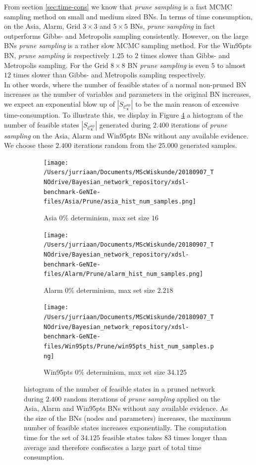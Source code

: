 \documentclass[a4paper, twoside, 11pt]{report}
\newcommand{\bfx}{{\mathbf{x}}}
\newcommand{\C}{{\mathcal C}}
\theoremstyle{plain}
\theoremstyle{definition}
\theoremstyle{remark}
\newcommand{\ps}{\textit{prune sampling }}
\begin{document}
From section \ref{sec:time-cons} we know that \ps is a fast MCMC sampling method on small and medium sized BNs. In terms of time consumption, on the Asia, Alarm, Grid $3 \times 3$ and $5 \times 5$ BNs, \ps in fact outperforms Gibbs- and Metropolis sampling consistently. However, on the large BNs \ps is a rather slow MCMC sampling method. For the Win95pts BN, \ps is respectively $1.25$ to $2$ times slower than Gibbs- and Metropolis sampling. For the Grid $8 \times 8$ BN \ps is even $5$ to almost $12$ times slower than Gibbs- and Metropolis sampling respectively. \\

In other words, where the number of feasible states of a normal non-pruned BN increases as the number of variables and parameters in the original BN increases, we expect an exponential blow up of $|S_{\C_\bfx^{\text{np}}}|$ to be the main reason of excessive time-consumption. To illustrate this, we display in Figure \ref{results4} a histogram of the number of feasible states $|S_{\C_\bfx^{\text{np}}}|$ generated during $2.400$ iterations of \ps on the Asia, Alarm and Win95pts BNs without any available evidence. We choose these $2.400$ iterations random from the $25.000$ generated samples. 
\begin{figure}[h!]
\centering
\captionsetup[subfigure]{justification=centering}

\begin{subfigure}{.3\linewidth}
\texttt{[image: /Users/jurriaan/Documents/MScWiskunde/20180907\_TNOdrive/Bayesian\_network\_repository/xdsl-benchmark-GeNIe-files/Asia/Prune/asia\_hist\_num\_samples.png]}
\caption{Asia 0\% determinism, max set size $16$}%
\label{asia_ev}%
\end{subfigure}\hfill%
\begin{subfigure}{.3\linewidth}
\texttt{[image: /Users/jurriaan/Documents/MScWiskunde/20180907\_TNOdrive/Bayesian\_network\_repository/xdsl-benchmark-GeNIe-files/Alarm/Prune/alarm\_hist\_num\_samples.png]}
\caption{Alarm 0\% determinism, max set size $2.218$}%
\label{alarm_ev}%
\end{subfigure}\hfill%
\begin{subfigure}{.3\linewidth}
\texttt{[image: /Users/jurriaan/Documents/MScWiskunde/20180907\_TNOdrive/Bayesian\_network\_repository/xdsl-benchmark-GeNIe-files/Win95pts/Prune/win95pts\_hist\_num\_samples.png]}
\caption{Win95pts 0\% determinism, max set size $34.125$}%
\label{win95pts_ev}%
\end{subfigure}\hfill%
\vspace{0.75pc}
\caption{histogram of the number of feasible states in a pruned network during $2.400$ random iterations of \ps applied on the Asia, Alarm and Win95pts BNs without any available evidence. As the size of the BNs (nodes and parameters) increases, the maximum number of feasible states increases exponentially. The computation time for the set of $34.125$ feasible states takes $83$ times longer than average and therefore confiscates a large part of total time consumption.}
\label{results4}
\end{figure}\\
\end{document}
